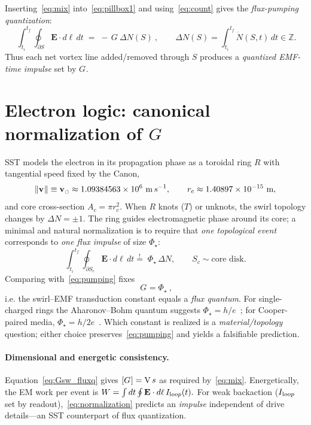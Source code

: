 \documentclass[10pt,reprint,aps,onecolumn,nofootinbib]{revtex4-2}
\def\boldsymbol#1{#1}%
\def\mathcal#1{#1}%
\def\!{}%
\def\swirlarrow{}%
\DeclareRobustCommand{\swirlarrow}{%
    \mathchoice{\mkern-2mu\scriptstyle\boldsymbol{\circlearrowleft}}%
    {\mkern-2mu\scriptstyle\boldsymbol{\circlearrowleft}}%
    {\mkern-2mu\scriptscriptstyle\boldsymbol{\circlearrowleft}}%
    {\mkern-2mu\scriptscriptstyle\boldsymbol{\circlearrowleft}}%
}
\begin{document}
Inserting~\ref{eq:mix} into~\ref{eq:pillbox1} and using~\ref{eq:count} gives the \emph{flux-pumping quantization}:
\begin{equation}
\boxed{\ \int_{t_i}^{t_f}\!\!\oint_{\partial S}\mathbf E\!\cdot d\boldsymbol\ell\,dt
\;=\; -\,\mathcal G_{\swirlarrow}\, \Delta N(S)\ },
\qquad \Delta N(S)=\int_{t_i}^{t_f}\!\dot N(S,t)\,dt \in \mathbb Z.
\label{eq:pumping}
\end{equation}
Thus each net vortex line added/removed through $S$ produces a \emph{quantized EMF-time impulse} set by $\mathcal G_{\swirlarrow}$.

\section{Electron logic: canonical normalization of \texorpdfstring{$\mathcal G$}{G}}
SST models the electron in its propagation phase as a toroidal ring $\mathcal R$ with tangential speed fixed by the Canon,
\begin{equation}
\|\mathbf v_{\swirlarrow}\| \equiv \mathbf{v}_{\scriptscriptstyle\boldsymbol{\circlearrowleft}} \approx 1.09384563\times 10^6~{\textrm m\,s^{-1}},
\qquad r_c \approx 1.40897\times 10^{-15}~{\textrm m},
\label{eq:canonCe}
\end{equation}
and core cross-section $A_c=\pi r_c^2$. When $\mathcal R$ knots ($\mathcal T$) or unknots, the swirl topology changes by $\Delta N=\pm 1$. The ring guides electromagnetic phase around its core; a minimal and natural normalization is to require that \emph{one topological event} corresponds to \emph{one flux impulse} of size $\Phi_\star$:
\begin{equation}
\int_{t_i}^{t_f}\!\!\oint_{\partial S_c}\mathbf E\!\cdot d\boldsymbol\ell\,dt
\stackrel{!}{=}\; \Phi_\star \,\Delta N,
\qquad S_c \sim \text{core disk}.
\label{eq:normalization}
\end{equation}
Comparing with~\ref{eq:pumping} fixes
\begin{equation}
\boxed{\ \mathcal G_{\swirlarrow} = \Phi_\star \ },
\label{eq:Gsw_fluxq}
\end{equation}
i.e. the swirl--EMF transduction constant equals a \emph{flux quantum}. For single-charged rings the Aharonov--Bohm quantum suggests $\Phi_\star=h/e$~\cite{Aharonov1959}; for Cooper-paired media, $\Phi_\star=h/2e$~\cite{Tinkham2004}. Which constant is realized is a \emph{material/topology} question; either choice preserves~\ref{eq:pumping} and yields a falsifiable prediction.

\paragraph{Dimensional and energetic consistency.}
    Equation~\ref{eq:Gsw_fluxq} gives $[\mathcal G_{\swirlarrow}]={\textrm V\,s}$ as required by~\ref{eq:mix}. Energetically, the EM work per event is
    \(
    W=\int dt\oint \mathbf E\cdot d\boldsymbol\ell\,I_{\textrm loop}(t).
    \)
    For weak backaction ($I_{\textrm loop}$ set by readout),~\ref{eq:normalization} predicts an \emph{impulse} independent of drive details—an SST counterpart of flux quantization.
\end{document}
